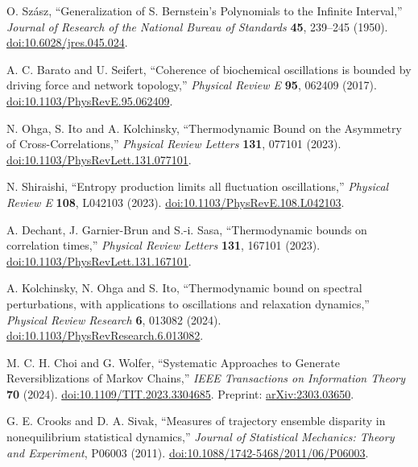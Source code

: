 O. Sz\'asz, ``Generalization of S. Bernstein's Polynomials to the Infinite Interval,''
\emph{Journal of Research of the National Bureau of Standards}
\textbf{45}, 239--245 (1950).
\href{https://doi.org/10.6028/jres.045.024}{doi:10.6028/jres.045.024}.

A. C. Barato and U. Seifert,
``Coherence of biochemical oscillations is bounded by driving force and network topology,''
\emph{Physical Review E} \textbf{95}, 062409 (2017).
\href{https://doi.org/10.1103/PhysRevE.95.062409}{doi:10.1103/PhysRevE.95.062409}.

N. Ohga, S. Ito and A. Kolchinsky,
``Thermodynamic Bound on the Asymmetry of Cross-Correlations,''
\emph{Physical Review Letters} \textbf{131}, 077101 (2023).
\href{https://doi.org/10.1103/PhysRevLett.131.077101}{doi:10.1103/PhysRevLett.131.077101}.

N. Shiraishi, ``Entropy production limits all fluctuation oscillations,''
\emph{Physical Review E} \textbf{108}, L042103 (2023).
\href{https://doi.org/10.1103/PhysRevE.108.L042103}{doi:10.1103/PhysRevE.108.L042103}.

A. Dechant, J. Garnier-Brun and S.-i. Sasa,
``Thermodynamic bounds on correlation times,''
\emph{Physical Review Letters} \textbf{131}, 167101 (2023).
\href{https://doi.org/10.1103/PhysRevLett.131.167101}{doi:10.1103/PhysRevLett.131.167101}.

A. Kolchinsky, N. Ohga and S. Ito,
``Thermodynamic bound on spectral perturbations, with applications to oscillations and relaxation dynamics,''
\emph{Physical Review Research} \textbf{6}, 013082 (2024).
\href{https://doi.org/10.1103/PhysRevResearch.6.013082}{doi:10.1103/PhysRevResearch.6.013082}.

M. C. H. Choi and G. Wolfer,
``Systematic Approaches to Generate Reversiblizations of Markov Chains,''
\emph{IEEE Transactions on Information Theory} \textbf{70} (2024).
\href{https://doi.org/10.1109/TIT.2023.3304685}{doi:10.1109/TIT.2023.3304685}.
Preprint: \href{https://arxiv.org/abs/2303.03650}{arXiv:2303.03650}.

G. E. Crooks and D. A. Sivak,
``Measures of trajectory ensemble disparity in nonequilibrium statistical dynamics,''
\emph{Journal of Statistical Mechanics: Theory and Experiment}, P06003 (2011).
\href{https://doi.org/10.1088/1742-5468/2011/06/P06003}{doi:10.1088/1742-5468/2011/06/P06003}.

